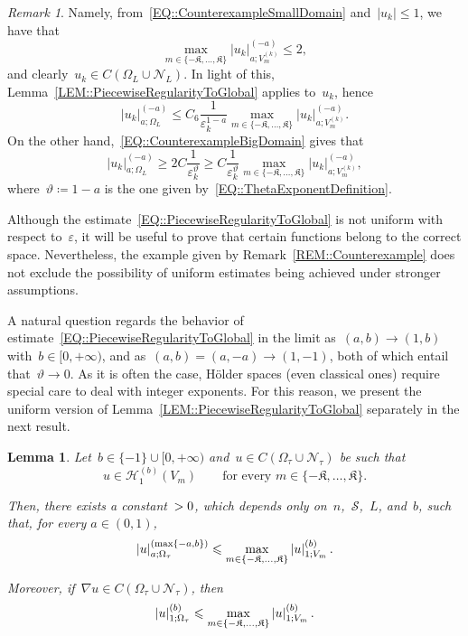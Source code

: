 \documentclass[12pt,a4paper]{amsart}
\makeatletter
\numberwithin{equation}{section}
\newtheorem{lemma}[theorem]{Lemma}
\theoremstyle{definition}
\theoremstyle{remark}
\newtheorem{remark}[theorem]{Remark}
\newcommand{\eps}{\varepsilon}
\newcommand{\abs}[1]{\left\lvert#1\right\rvert}
\renewcommand{\leq}{\leqslant}
\renewcommand{\geq}{\geqslant}
\newcommand{\const}[1]{%
  \csname const@#1\endcsname%
}
\makeatother
\begin{document}
\begin{remark}
    Namely, from~\eqref{EQ::CounterexampleSmallDomain} and~$\abs{u_k} \leq 1$, we have that
    \[\max_{m \in \{-\mathfrak{K},\dots,\mathfrak{K}\}} \abs{u_k}_{a; V_m^{(k)}}^{(-a)} \leq 2,\]
    and clearly~$u_k \in C(\Omega_L \cup \mathcal{N}_L)$. In light of this, Lemma~\ref{LEM::PiecewiseRegularityToGlobal} applies to~$u_k$, hence
    \[\abs{u_k}_{a; \Omega_L}^{(-a)} \leq C_6 \frac{1}{\eps_k^{1-a}}\max_{m \in \{-\mathfrak{K},\dots,\mathfrak{K}\}} \abs{u_k}_{a; V_m^{(k)}}^{(-a)}.\]
    On the other hand,~\eqref{EQ::CounterexampleBigDomain} gives that
    \[\abs{u_k}_{a; \Omega_L}^{(-a)} \geq 2C \frac{1}{\eps_k^{\vartheta}} \geq C \frac{1}{\eps_k^{\vartheta}} \max_{m \in \{-\mathfrak{K},\dots,\mathfrak{K}\}} \abs{u_k}_{a; V_m^{(k)}}^{(-a)},\]
    where~$\vartheta \coloneq 1-a$ is the one given by~\eqref{EQ::ThetaExponentDefinition}. 
\end{remark}

Although the estimate~\eqref{EQ::PiecewiseRegularityToGlobal} is not uniform with respect to~$\eps$, it will be useful to prove that certain functions belong to the correct space. Nevertheless, the example given by Remark~\ref{REM::Counterexample} does not exclude the possibility of uniform estimates being achieved under stronger assumptions.

A natural question regards the behavior of estimate~\eqref{EQ::PiecewiseRegularityToGlobal} in the limit as~$(a,b) \to (1,b)$ with~$b \in [0,+\infty)$, and as~$(a,b) = (a,-a) \to (1,-1)$, both of which entail that~$\vartheta \to 0$. As it is often the case, Hölder spaces (even classical ones) require special care to deal with integer exponents. For this reason, we present the uniform version of Lemma~\ref{LEM::PiecewiseRegularityToGlobal} separately in the next result. %
\begin{lemma}\label{LEM::PiecewiseLipschitzToGlobalLipschitz}
    Let~$b \in \{-1\} \cup [0,+\infty)$ and~$u \in C(\Omega_\tau \cup \mathcal{N}_\tau)$ be such that%
    \begin{equation}
        u \in \mathcal{H}_1^{(b)}(V_m)\qquad \text{for every }m \in \{-\mathfrak{K},\dots,\mathfrak{K}\}.
    \end{equation}

    Then, there exists a constant~$\const{CONST::PiecewiseLipschitzToGlobalLipschitz} > 0$, which depends only on~$n$,~$\mathcal{S}$,~$L$, and~$b$, such that, for every $a \in (0,1)$,
    \begin{equation}\label{EQ::PiecewiseLipschitzToGlobalHolder}
        \abs{u}_{a; \Omega_\tau}^{(\max\{-a,b\})} \leq \const{CONST::PiecewiseLipschitzToGlobalLipschitz} \max_{m \in \{-\mathfrak{K},\dots,\mathfrak{K}\}} \abs{u}_{1; V_m}^{(b)}.
    \end{equation}

    Moreover, if~$\nabla u \in C(\Omega_\tau \cup \mathcal{N}_\tau)$, then
    \begin{equation}\label{EQ::PiecewiseLipschitzToGlobalLipschitz}
        \abs{u}_{1; \Omega_\tau}^{(b)} \leq \const{CONST::PiecewiseLipschitzToGlobalLipschitz} \max_{m \in \{-\mathfrak{K},\dots,\mathfrak{K}\}} \abs{u}_{1; V_m}^{(b)}.
    \end{equation}
\end{lemma}
\end{document}
